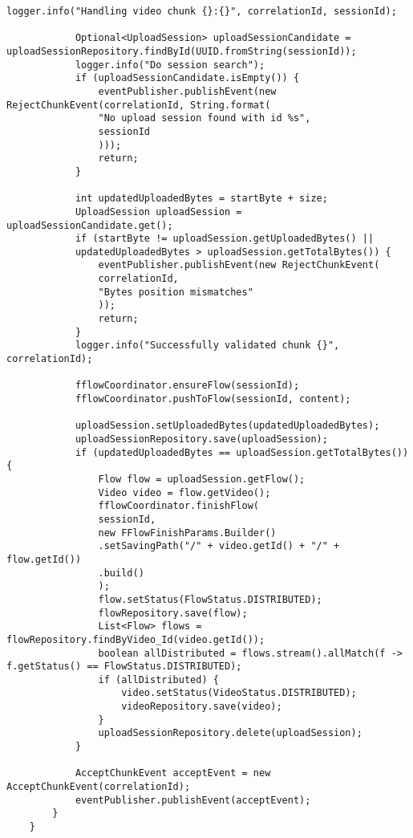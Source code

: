 \begin{lstlisting}[caption={UploaderManager.java}]
			logger.info("Handling video chunk {}:{}", correlationId, sessionId);
			
			Optional<UploadSession> uploadSessionCandidate = uploadSessionRepository.findById(UUID.fromString(sessionId));
			logger.info("Do session search");
			if (uploadSessionCandidate.isEmpty()) {
				eventPublisher.publishEvent(new RejectChunkEvent(correlationId, String.format(
				"No upload session found with id %s",
				sessionId
				)));
				return;
			}
			
			int updatedUploadedBytes = startByte + size;
			UploadSession uploadSession = uploadSessionCandidate.get();
			if (startByte != uploadSession.getUploadedBytes() ||
			updatedUploadedBytes > uploadSession.getTotalBytes()) {
				eventPublisher.publishEvent(new RejectChunkEvent(
				correlationId,
				"Bytes position mismatches"
				));
				return;
			}
			logger.info("Successfully validated chunk {}", correlationId);
			
			fflowCoordinator.ensureFlow(sessionId);
			fflowCoordinator.pushToFlow(sessionId, content);
			
			uploadSession.setUploadedBytes(updatedUploadedBytes);
			uploadSessionRepository.save(uploadSession);
			if (updatedUploadedBytes == uploadSession.getTotalBytes()) {
				Flow flow = uploadSession.getFlow();
				Video video = flow.getVideo();
				fflowCoordinator.finishFlow(
				sessionId,
				new FFlowFinishParams.Builder()
				.setSavingPath("/" + video.getId() + "/" + flow.getId())
				.build()
				);
				flow.setStatus(FlowStatus.DISTRIBUTED);
				flowRepository.save(flow);
				List<Flow> flows = flowRepository.findByVideo_Id(video.getId());
				boolean allDistributed = flows.stream().allMatch(f -> f.getStatus() == FlowStatus.DISTRIBUTED);
				if (allDistributed) {
					video.setStatus(VideoStatus.DISTRIBUTED);
					videoRepository.save(video);
				}
				uploadSessionRepository.delete(uploadSession);
			}
			
			AcceptChunkEvent acceptEvent = new AcceptChunkEvent(correlationId);
			eventPublisher.publishEvent(acceptEvent);
		}
	}
\end{lstlisting}
